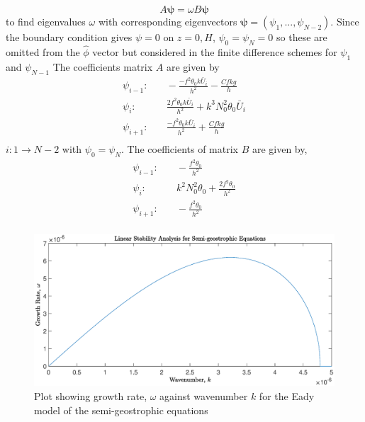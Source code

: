 \begin{equation*}
A\bm{\psi} = \omega B\bm{\psi}
\end{equation*}
to find eigenvalues $\omega$ with corresponding eigenvectors $\bm{\psi} = \left(\psi_1, ... , \psi_{N-2}\right)$. Since the boundary condition gives $\psi = 0$ on $z = 0, H$, $\psi_0 = \psi_N = 0$ so these are omitted from the $\hat{\phi}$ vector but considered in the finite difference schemes for $\psi_1$ and $\psi_{N-1}$
The coefficients matrix $A$ are given by
\begin{equation}
\begin{aligned}
\psi_{i-1}:& \quad -\frac{-f^2\theta_0k\bar{U}_i}{h^2} - \frac{Cfkg}{h}\\
\psi_i:& \quad \frac{2f^2\theta_0k\bar{U}_i}{h^2} + k^3N_0^2\theta_0\bar{U}_i\\
\psi_{i+1}:& \quad \frac{-f^2\theta_0k\bar{U}_i}{h^2} + \frac{Cfkg}{h}\\
\end{aligned}
\end{equation}
$i: 1 \rightarrow N-2$ with $\psi_0 = \psi_{N}$. The coefficients of matrix $B$ are given by,
\begin{equation*}
\begin{aligned}
\psi_{i-1}:& \quad -\frac{f^2\theta_0}{h^2}\\
\psi_i:& \quad k^2N_0^2\theta_0 + \frac{2f^2\theta_0}{h^2}\\
\psi_{i+1}:& \quad -\frac{f^2\theta_0}{h^2}\\
\end{aligned}
\end{equation*}
\begin{figure}[h]
	\centering
	\includegraphics[width=\linewidth]{project/Linear_stability_analysis}
	\caption[Linear stability analysis results for the semi-geostrophic equations]{Plot showing growth rate, $\omega$ against wavenumber $k$ for the Eady model of the semi-geostrophic equations}
	\label{fig:linearstabilityanalysis}
\end{figure}
